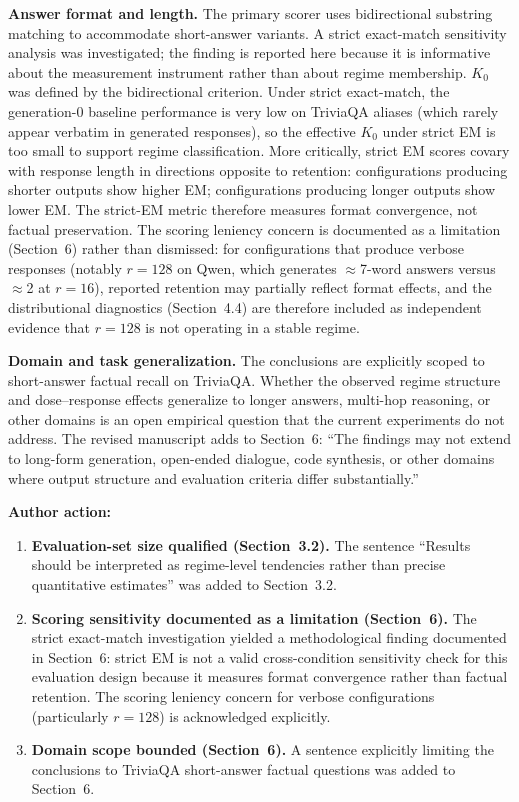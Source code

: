 \documentclass[11pt,a4paper]{article}
\newcommand{\arhead}[1]{\medskip\noindent\textbf{#1}\par\smallskip}
\newcommand{\newtext}[1]{\textcolor{chgcolor}{``#1''}}
\begin{document}
\textbf{Answer format and length.}
The primary scorer uses bidirectional substring matching to accommodate
short-answer variants. A strict exact-match sensitivity analysis was
investigated; the finding is reported here because it is informative about
the measurement instrument rather than about regime membership. $K_0$
was defined by the bidirectional criterion. Under strict exact-match,
the generation-0 baseline performance is very low on TriviaQA aliases
(which rarely appear verbatim in generated responses), so the
effective $K_0$ under strict EM is too small to support regime
classification. More critically, strict EM scores covary with response
length in directions opposite to retention: configurations producing shorter
outputs show higher EM; configurations producing longer outputs show lower
EM. The strict-EM metric therefore measures format convergence, not
factual preservation. The scoring leniency concern is documented as a
limitation (Section~6) rather than dismissed: for configurations that
produce verbose responses (notably $r=128$ on Qwen, which generates
$\approx$7-word answers versus $\approx$2 at $r=16$), reported retention
may partially reflect format effects, and the distributional diagnostics
(Section~4.4) are therefore included as independent evidence that $r=128$
is not operating in a stable regime.

\textbf{Domain and task generalization.}
The conclusions are explicitly scoped to short-answer factual recall on
TriviaQA. Whether the observed regime structure and dose--response effects
generalize to longer answers, multi-hop reasoning, or other domains is an
open empirical question that the current experiments do not address.
The revised manuscript adds to Section~6: \newtext{The findings may not extend to long-form generation, open-ended dialogue, code synthesis, or other domains where output structure and evaluation criteria differ substantially.}

\arhead{Author action:}
\begin{enumerate}[leftmargin=1.4em,itemsep=0.3em]
\item \textbf{Evaluation-set size qualified (Section~3.2).}
      The sentence \newtext{Results should be interpreted as
      regime-level tendencies rather than precise quantitative
      estimates} was added to Section~3.2.
\item \textbf{Scoring sensitivity documented as a limitation (Section~6).}
      The strict exact-match investigation yielded a methodological finding
      documented in Section~6: strict EM is not a valid cross-condition
      sensitivity check for this evaluation design because it measures
      format convergence rather than factual retention.
      The scoring leniency concern for verbose configurations
      (particularly $r=128$) is acknowledged explicitly.
\item \textbf{Domain scope bounded (Section~6).}
      A sentence explicitly limiting the conclusions to TriviaQA
      short-answer factual questions was added to Section~6.
\end{enumerate}
\end{document}
